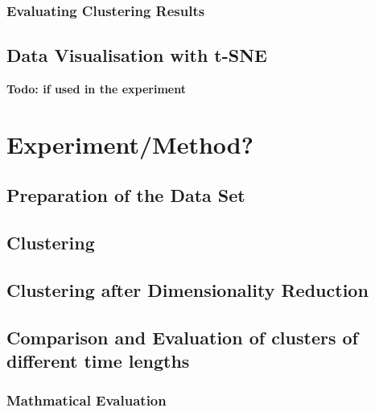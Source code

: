     \subsubsection{Evaluating Clustering Results}
    \label{section:TheoryEvaluatingClusteringResults}
    

  \subsection{Data Visualisation with t-SNE}
  \textbf{Todo: if used in the experiment}



\section{Experiment/Method?}
\label{section:Experiment}


  \subsection{Preparation of the Data Set}
  \label{section:ExperimentPreparationDataSet}
  

  \subsection{Clustering}
  \label{section:ExperimentClustering}
  

  \subsection{Clustering after Dimensionality Reduction}
  \label{section:ExperimentClusteringAfterDimensionalityReduction}
  

  \subsection{Comparison and Evaluation of clusters of different time lengths}
  \label{section:ExperimentComparisonTimeLengths}
  
  
  \subsubsection{Mathmatical Evaluation}
  
